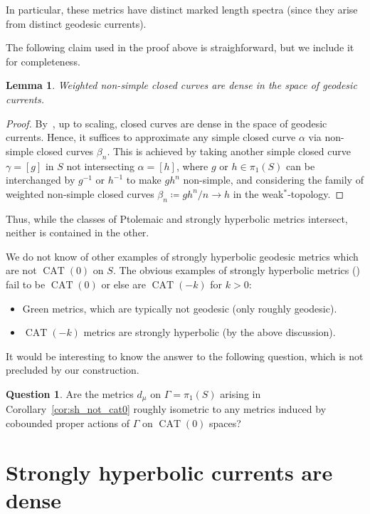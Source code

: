 \documentclass[12pt]{amsart}
\numberwithin{equation}{section}
\numberwithin{figure}{section}
\newtheorem{lemma}[equation]{Lemma}
\theoremstyle{definition}
\newtheorem{question}[equation]{Question}
\theoremstyle{plain}
\DeclareMathOperator{\CAT}{CAT}
\begin{document}
In particular, these metrics have distinct marked length spectra (since they arise from distinct geodesic currents).

The following claim used in the proof above is straighforward, but we include it for completeness.
\begin{lemma}
\label{lem:nonsimple_dense}
Weighted non-simple closed curves are dense in the space of geodesic currents.
\end{lemma}
\begin{proof} By~\cite[Proposition~4.4]{Bonahon86:EndsHyperbolicManifolds}, up to scaling, closed curves are dense in the space of geodesic currents. Hence, it suffices to approximate any simple closed curve $\alpha$ via non-simple closed curves $\beta_n$. This is achieved by taking another simple closed curve $\gamma=[g]$ in $S$ not intersecting $\alpha=[h]$, where $g$ or  $h \in \pi_1(S)$ can be interchanged by $g^{-1}$ or $h^{-1}$ to make $gh^n$ non-simple, and considering the family of weighted non-simple closed curves $\beta_n \coloneqq gh^n/n \to h$ in the weak$^*$-topology.
\end{proof}
Thus, while the classes of Ptolemaic and strongly hyperbolic metrics intersect, neither is contained in the other.

We do not know of other examples of strongly hyperbolic geodesic metrics which are not $\CAT(0)$ on $S$.
The obvious examples of strongly hyperbolic metrics (\cite{NicaSpakula2016}) fail to be $\CAT(0)$ or else are $\CAT(-k)$ for $k>0$:
\begin{itemize}
\item Green metrics, which are typically not geodesic (only roughly geodesic).
\item $\CAT(-k)$ metrics are strongly hyperbolic (by the above discussion).
\end{itemize}

It would be interesting to know the  answer to the following question, which is not precluded by our construction.

\begin{question}
Are the metrics $d_{\mu}$ on $\Gamma=\pi_1(S)$ arising in Corollary~\ref{cor:sh_not_cat0} roughly isometric to any metrics induced by cobounded proper actions of $\Gamma$ on $\CAT(0)$ spaces?
\end{question}






\section{Strongly hyperbolic currents are dense}
\label{sec:stronglyhyp}
\end{document}

